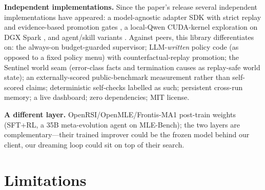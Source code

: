 \documentclass[11pt,a4paper]{article}
\newcommand{\hdr}[1]{\textbf{#1}}
\begin{document}
\hdr{Independent implementations.} Since the paper's release several
independent implementations have appeared: a model-agnostic adapter SDK with
strict replay and evidence-based promotion gates \cite{drsdk}, a local-Qwen
CUDA-kernel exploration on DGX Spark \cite{dspark}, and agent/skill variants
\cite{hermesdrsi}. Against peers, this library differentiates on: the
always-on budget-guarded supervisor; LLM-\emph{written} policy code (as
opposed to a fixed policy menu) with counterfactual-replay promotion; the
Sentinel world seam (error-class facts and termination causes as replay-safe
world state); an externally-scored public-benchmark measurement rather than
self-scored claims; deterministic self-checks labelled as such; persistent cross-run memory; a
live dashboard; zero dependencies; MIT license.

\hdr{A different layer.} OpenRSI/OpenMLE/Frontis-MA1 \cite{openrsi,
mlebench} post-train weights (SFT+RL, a 35B meta-evolution agent on
MLE-Bench); the two layers are complementary---their trained improver could
be the frozen model behind our client, our dreaming loop could sit on top of
their search.

\section{Limitations}
\label{sec:limits}
\end{document}
